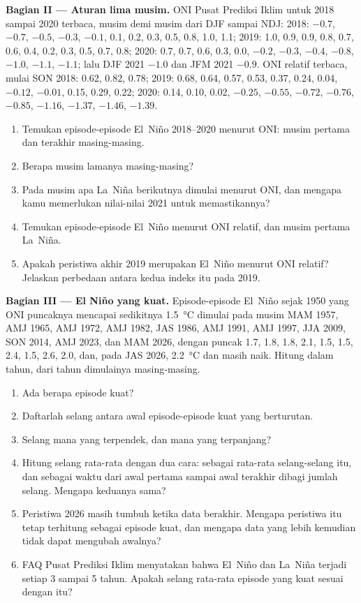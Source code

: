 \begin{problem}
\medskip\noindent\textbf{Bagian II --- Aturan lima musim.}
ONI Pusat Prediksi Iklim untuk 2018 sampai 2020 terbaca, musim demi musim dari DJF sampai
NDJ: 2018: $-0.7$, $-0.7$, $-0.5$, $-0.3$, $-0.1$, 0.1, 0.2, 0.3, 0.5, 0.8, 1.0, 1.1; 2019: 1.0,
0.9, 0.9, 0.8, 0.7, 0.6, 0.4, 0.2, 0.3, 0.5, 0.7, 0.8; 2020: 0.7, 0.7, 0.6, 0.3, 0.0, $-0.2$,
$-0.3$, $-0.4$, $-0.8$, $-1.0$, $-1.1$, $-1.1$; lalu DJF 2021 $-1.0$ dan JFM 2021 $-0.9$. ONI
relatif terbaca, mulai SON 2018: 0.62, 0.82, 0.78; 2019: 0.68, 0.64, 0.57, 0.53, 0.37, 0.24,
0.04, $-0.12$, $-0.01$, 0.15, 0.29, 0.22; 2020: 0.14, 0.10, 0.02, $-0.25$, $-0.55$, $-0.72$,
$-0.76$, $-0.85$, $-1.16$, $-1.37$, $-1.46$, $-1.39$.
\begin{enumerate}[resume]
  \item Temukan episode-episode El~Niño 2018--2020 menurut ONI: musim pertama dan terakhir masing-masing.
  \item Berapa musim lamanya masing-masing?
  \item Pada musim apa La~Niña berikutnya dimulai menurut ONI, dan mengapa kamu memerlukan
        nilai-nilai 2021 untuk memastikannya?
  \item Temukan episode-episode El~Niño menurut ONI relatif, dan musim pertama La~Niña.
  \item Apakah peristiwa akhir 2019 merupakan El~Niño menurut ONI relatif? Jelaskan perbedaan
        antara kedua indeks itu pada 2019.
\end{enumerate}

\medskip\noindent\textbf{Bagian III --- El Niño yang kuat.}
Episode-episode El~Niño sejak 1950 yang ONI puncaknya mencapai sedikitnya \qty{1.5}{\celsius} dimulai pada
musim MAM 1957, AMJ 1965, AMJ 1972, AMJ 1982, JAS 1986, AMJ 1991, AMJ 1997, JJA 2009, SON 2014,
AMJ 2023, dan MAM 2026, dengan puncak 1.7, 1.8, 1.8, 2.1, 1.5, 1.5, 2.4, 1.5, 2.6, 2.0, dan, pada
JAS 2026, \qty{2.2}{\celsius} dan masih naik. Hitung dalam tahun, dari tahun dimulainya masing-masing.
\begin{enumerate}[resume]
  \item Ada berapa episode kuat?
  \item Daftarlah selang antara awal episode-episode kuat yang berturutan.
  \item Selang mana yang terpendek, dan mana yang terpanjang?
  \item Hitung selang rata-rata dengan dua cara: sebagai rata-rata selang-selang itu, dan sebagai waktu
        dari awal pertama sampai awal terakhir dibagi jumlah selang. Mengapa keduanya sama?
  \item Peristiwa 2026 masih tumbuh ketika data berakhir. Mengapa peristiwa itu tetap terhitung
        sebagai episode kuat, dan mengapa data yang lebih kemudian tidak dapat mengubah awalnya?
  \item FAQ Pusat Prediksi Iklim menyatakan bahwa El~Niño dan La~Niña terjadi setiap 3 sampai 5
        tahun. Apakah selang rata-rata episode yang kuat sesuai dengan itu?
\end{enumerate}


\end{problem}
